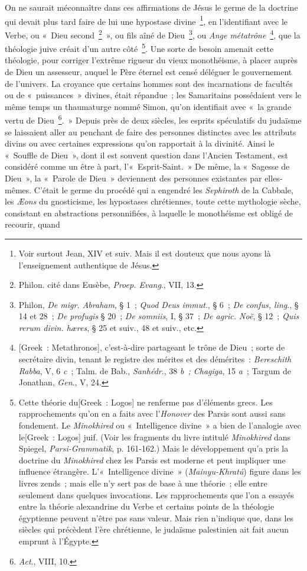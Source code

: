 \documentclass[french,twoside]{book} %
\begin{document}
On ne saurait méconnaître dans ces affirmations de Jésus le germe de la doctrine qui devait plus tard faire de lui une hypostase divine \footnote{Voir surtout Jean, XIV et suiv. Mais il est douteux que nous ayons là l’enseignement authentique de Jésus.}, en l’identifiant avec le Verbe, ou « Dieu second \footnote{ Philon. cité dans Eusèbe, {\itshape Proep. Evang}., VII, 13.} », ou fils aîné de Dieu \footnote{ Philon, {\itshape De migr. Abraham}, § 1 ; {\itshape Quod Deus immut}., § 6 ; {\itshape De confus, ling}., § 14 et 28 ; {\itshape De profugis} § 20 ; {\itshape De somniis}, I, § 37 ; {\itshape De agric. Noë}, § 12 ; {\itshape Quis rerum divin. hæres}, § 25 et suiv., 48 et suiv., etc.}, ou {\itshape Ange métatrône} \footnote{ [Greek : Metathronos], c’est-à-dire partageant le trône de Dieu ; sorte de secrétaire divin, tenant le registre des mérites et des démérites : {\itshape Bereschith Rabba}, V, 6 {\itshape c} ; Talm. de Bab., {\itshape Sanhédr}., 38 {\itshape b ; Chagiga}, 15 {\itshape a} ; Targum de Jonathan, {\itshape Gen}., V, 24.}, que la théologie juive créait d’un autre côté \footnote{ Cette théorie du[Greek : Logos] ne renferme pas d’éléments grecs. Les rapprochements qu’on en a faits avec l’{\itshape Honover} des Parsis sont aussi sans fondement. Le {\itshape Minokhired} ou « Intelligence divine » a bien de l’analogie avec le[Greek : Logos] juif. (Voir les fragments du livre intitulé {\itshape Minokhired} dans Spiegel, {\itshape Parsi-Grammatik}, p. 161-162.) Mais le développement qu’a pris la doctrine du {\itshape Minokhired} chez les Parsis est moderne et peut impliquer une influence étrangère. L’« Intelligence divine » ({\itshape Mainyu-Khratú}) figure dans les livres zends ; mais elle n’y sert pas de base à une théorie ; elle entre seulement dans quelques invocations. Les rapprochements que l’on a essayés entre la théorie alexandrine du Verbe et certains points de la théologie égyptienne peuvent n’être pas sans valeur. Mais rien n’indique que, dans les siècles qui précèdent l’ère chrétienne, le judaïsme palestinien ait fait aucun emprunt à l’Égypte.}. Une sorte de besoin amenait cette théologie, pour corriger l’extrême rigueur du vieux monothéisme, à placer auprès de Dieu un assesseur, auquel le Père éternel est censé déléguer le gouvernement de l’univers. La croyance que certains hommes sont des incarnations de facultés ou de « puissances » divines, était répandue ; les Samaritains possédaient vers le même temps un thaumaturge nommé Simon, qu’on identifiait avec « la grande vertu de Dieu \footnote{{\itshape Act}., VIII, 10.}. » Depuis près de deux siècles, les esprits spéculatifs du judaïsme se laissaient aller au penchant de faire des personnes distinctes avec les attributs divins ou avec certaines expressions qu’on rapportait à la divinité. Ainsi le « Souffle de Dieu », dont il est souvent question dans l’Ancien Testament, est considéré comme un être à part, l’« Esprit-Saint. » De même, la « Sagesse de Dieu », la « Parole de Dieu » deviennent des personnes existantes par elles-mêmes. C’était le germe du procédé qui a engendré les {\itshape Sephiroth} de la Cabbale, les {\itshape Æons} du gnosticisme, les hypostases chrétiennes, toute cette mythologie sèche, consistant en abstractions personnifiées, à laquelle le monothéisme est obligé de recourir, quand 
\end{document}
